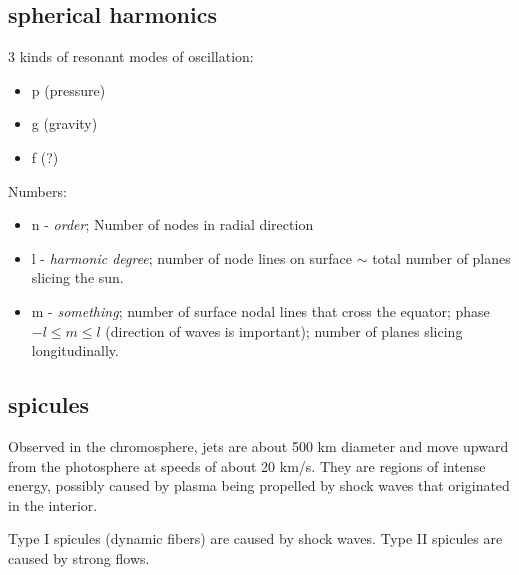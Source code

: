\documentclass{article}
\begin{document}
\subsection{spherical harmonics}
3 kinds of resonant modes of oscillation:
\begin{itemize}
    \item p (pressure)
    \item g (gravity)
    \item f (?)
\end{itemize}
Numbers:
\begin{itemize}
    \item n - \emph{order}; Number of nodes in radial direction
    \item l - \emph{harmonic degree}; number of node lines on
        surface $\sim$ total number of planes slicing the sun.
    \item m - \emph{something}; number of surface nodal lines that
        cross the equator; phase\\
        $-l \leq m \leq l$ (direction of waves is important); number of
        planes slicing longitudinally.
\end{itemize}

\subsection{spicules}
Observed in the chromosphere, jets are about 500 km diameter and move upward
from the photosphere at speeds of about 20 km/s. They are regions of intense
energy, possibly caused by plasma being propelled by shock waves that
originated in the interior.

Type I spicules (dynamic fibers) are caused by shock waves.
Type II spicules are caused by strong flows.
\end{document}

